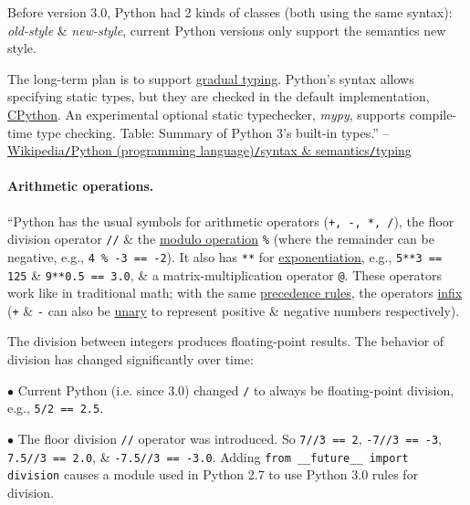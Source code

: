 \documentclass{article}
\numberwithin{equation}{section}
\begin{document}
Before version 3.0, Python had 2 kinds of classes (both using the same syntax): \textit{old-style} \& \textit{new-style}, current Python versions only support the semantics new style.

The long-term plan is to support \href{https://en.wikipedia.org/wiki/Gradual_typing}{gradual typing}. Python's syntax allows specifying static types, but they are checked in the default implementation, \href{https://en.wikipedia.org/wiki/CPython}{CPython}. An experimental optional static typechecker, \textit{mypy}, supports compile-time type checking. \textsf{Table: Summary of Python 3's built-in types}.'' -- \href{https://en.wikipedia.org/wiki/Python_(programming_language)#Typing}{Wikipedia\texttt{/}Python (programming language)\texttt{/}syntax \& semantics\texttt{/}typing}

\paragraph{Arithmetic operations.} ``Python has the usual symbols for arithmetic operators (\verb|+, -, *, /|), the floor division operator \verb|//| \& the \href{https://en.wikipedia.org/wiki/Modulo_operation}{modulo operation} \verb|%| (where the remainder can be negative, e.g., \verb|4 % -3 == -2|). It also has \texttt{**} for \href{https://en.wikipedia.org/wiki/Exponentiation}{exponentiation}, e.g., \verb|5**3 == 125| \& \verb|9**0.5 == 3.0|, \& a matrix-multiplication operator \verb|@|. These operators work like in traditional math; with the same \href{https://en.wikipedia.org/wiki/Order_of_operations}{precedence rules}, the operators \href{https://en.wikipedia.org/wiki/Infix_notation}{infix} (\texttt{+} \& \texttt{-} can also be \href{https://en.wikipedia.org/wiki/Unary_operation}{unary} to represent positive \& negative numbers respectively).

The division between integers produces floating-point results. The behavior of division has changed significantly over time:
\begin{enumerate*}
	\item[$\bullet$] Current Python (i.e. since 3.0) changed \verb|/| to always be floating-point division, e.g., \verb|5/2 == 2.5|.
	\item[$\bullet$] The floor division \verb|//| operator was introduced. So \verb|7//3 == 2|, \verb|-7//3 == -3|, \verb|7.5//3 == 2.0|, \& \verb|-7.5//3 == -3.0|. Adding \newline\verb|from __future__ import division| causes a module used in Python 2.7 to use Python 3.0 rules for division.
\end{enumerate*}
\end{document}
